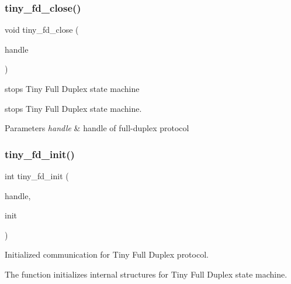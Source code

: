 \subsubsection{\texorpdfstring{tiny\+\_\+fd\+\_\+close()}{tiny\_fd\_close()}}
{\footnotesize\ttfamily void tiny\+\_\+fd\+\_\+close (\begin{DoxyParamCaption}\item[{\hyperlink{group__FULL__DUPLEX__API_ga91e6b79431fe38570fb102701ef0b7e8}{tiny\+\_\+fd\+\_\+handle\+\_\+t}}]{handle }\end{DoxyParamCaption})}



stops Tiny Full Duplex state machine 

stops Tiny Full Duplex state machine.


\begin{DoxyParams}{Parameters}
{\em handle} & handle of full-\/duplex protocol \\
\hline
\end{DoxyParams}
\mbox{\label{group__FULL__DUPLEX__API_ga27fa59dffd1575419753beb35282bad5}} 
\subsubsection{\texorpdfstring{tiny\+\_\+fd\+\_\+init()}{tiny\_fd\_init()}}
{\footnotesize\ttfamily int tiny\+\_\+fd\+\_\+init (\begin{DoxyParamCaption}\item[{\hyperlink{group__FULL__DUPLEX__API_ga91e6b79431fe38570fb102701ef0b7e8}{tiny\+\_\+fd\+\_\+handle\+\_\+t} $\ast$}]{handle,  }\item[{\hyperlink{group__FULL__DUPLEX__API_gad19ac27f4ba1d2b807e0a440b0c927d2}{tiny\+\_\+fd\+\_\+init\+\_\+t} $\ast$}]{init }\end{DoxyParamCaption})}



Initialized communication for Tiny Full Duplex protocol. 

The function initializes internal structures for Tiny Full Duplex state machine.


